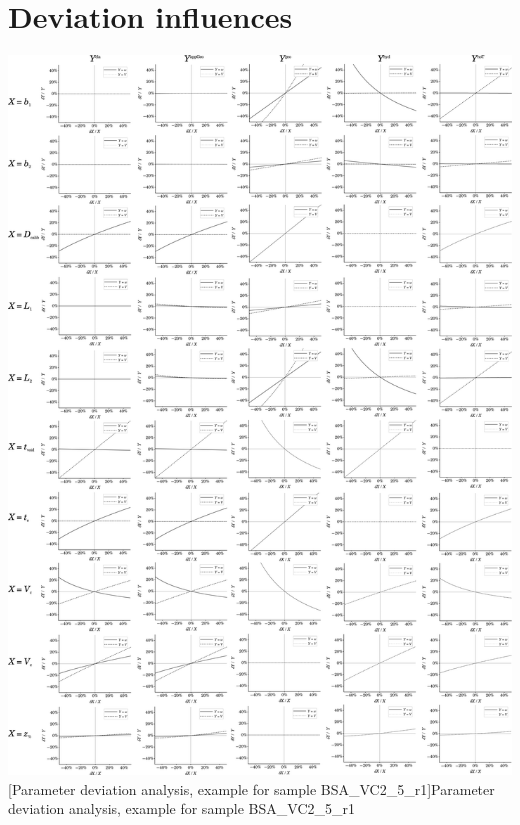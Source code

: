 \section*{Deviation influences}
  \begin{minipage}{\linewidth}
    \includegraphics[width=.925\linewidth]{./images/deltaAnalysis.pdf}
  [Parameter deviation analysis, example for sample BSA\_VC2\_5\_r1]{Parameter deviation analysis, 
  example for sample 
  BSA\_VC2\_5\_r1}
  \label{fig:DeviationAnalysis}
  \end{minipage}
\FloatBarrier
\restoregeometry
